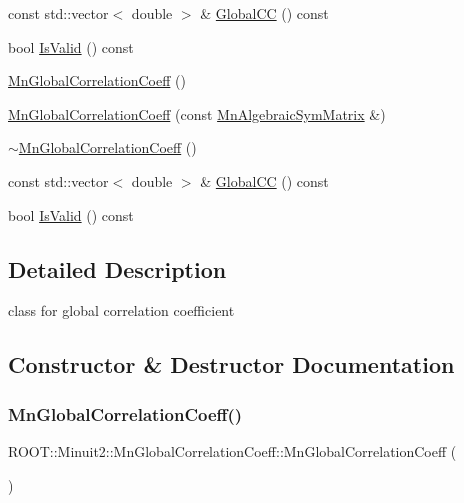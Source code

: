 \begin{DoxyCompactItemize}
\item 
const std\+::vector$<$ double $>$ \& \mbox{\hyperlink{classROOT_1_1Minuit2_1_1MnGlobalCorrelationCoeff_ab078e8b07600339fea0af842a8e2de00}{Global\+CC}} () const
\item 
bool \mbox{\hyperlink{classROOT_1_1Minuit2_1_1MnGlobalCorrelationCoeff_a1fe4d8b557ebda40e092ed3b7032fc44}{Is\+Valid}} () const
\item 
\mbox{\hyperlink{classROOT_1_1Minuit2_1_1MnGlobalCorrelationCoeff_a02d0479009453f093434429ce1eadf0a}{Mn\+Global\+Correlation\+Coeff}} ()
\item 
\mbox{\hyperlink{classROOT_1_1Minuit2_1_1MnGlobalCorrelationCoeff_a0781ecab575fcbc6dc59bfd85b1b978d}{Mn\+Global\+Correlation\+Coeff}} (const \mbox{\hyperlink{namespaceROOT_1_1Minuit2_a9e74ad97f5537a2e80e52b04d98ecc6e}{Mn\+Algebraic\+Sym\+Matrix}} \&)
\item 
\mbox{\hyperlink{classROOT_1_1Minuit2_1_1MnGlobalCorrelationCoeff_a2fb461accef753e2402948f0e2603d7a}{$\sim$\+Mn\+Global\+Correlation\+Coeff}} ()
\item 
const std\+::vector$<$ double $>$ \& \mbox{\hyperlink{classROOT_1_1Minuit2_1_1MnGlobalCorrelationCoeff_ab078e8b07600339fea0af842a8e2de00}{Global\+CC}} () const
\item 
bool \mbox{\hyperlink{classROOT_1_1Minuit2_1_1MnGlobalCorrelationCoeff_a1fe4d8b557ebda40e092ed3b7032fc44}{Is\+Valid}} () const
\end{DoxyCompactItemize}


\subsection{Detailed Description}
class for global correlation coefficient 

\subsection{Constructor \& Destructor Documentation}
\mbox{\label{classROOT_1_1Minuit2_1_1MnGlobalCorrelationCoeff_a02d0479009453f093434429ce1eadf0a}} 
\subsubsection{\texorpdfstring{MnGlobalCorrelationCoeff()}{MnGlobalCorrelationCoeff()}\hspace{0.1cm}{\footnotesize\ttfamily [1/6]}}
{\footnotesize\ttfamily R\+O\+O\+T\+::\+Minuit2\+::\+Mn\+Global\+Correlation\+Coeff\+::\+Mn\+Global\+Correlation\+Coeff (\begin{DoxyParamCaption}{ }\end{DoxyParamCaption})\hspace{0.3cm}{\ttfamily [inline]}}

